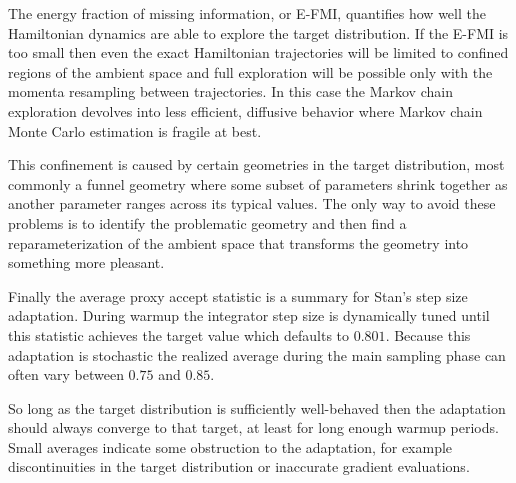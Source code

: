\documentclass[
  letterpaper,
  DIV=11,
  numbers=noendperiod]{scrartcl}
\begin{document}
The energy fraction of missing information, or E-FMI, quantifies how
well the Hamiltonian dynamics are able to explore the target
distribution. If the E-FMI is too small then even the exact Hamiltonian
trajectories will be limited to confined regions of the ambient space
and full exploration will be possible only with the momenta resampling
between trajectories. In this case the Markov chain exploration devolves
into less efficient, diffusive behavior where Markov chain Monte Carlo
estimation is fragile at best.

This confinement is caused by certain geometries in the target
distribution, most commonly a funnel geometry where some subset of
parameters shrink together as another parameter ranges across its
typical values. The only way to avoid these problems is to identify the
problematic geometry and then find a reparameterization of the ambient
space that transforms the geometry into something more pleasant.

Finally the average proxy accept statistic is a summary for Stan's step
size adaptation. During warmup the integrator step size is dynamically
tuned until this statistic achieves the target value which defaults to
\(0.801\). Because this adaptation is stochastic the realized average
during the main sampling phase can often vary between \(0.75\) and
\(0.85\).

So long as the target distribution is sufficiently well-behaved then the
adaptation should always converge to that target, at least for long
enough warmup periods. Small averages indicate some obstruction to the
adaptation, for example discontinuities in the target distribution or
inaccurate gradient evaluations.
\end{document}
